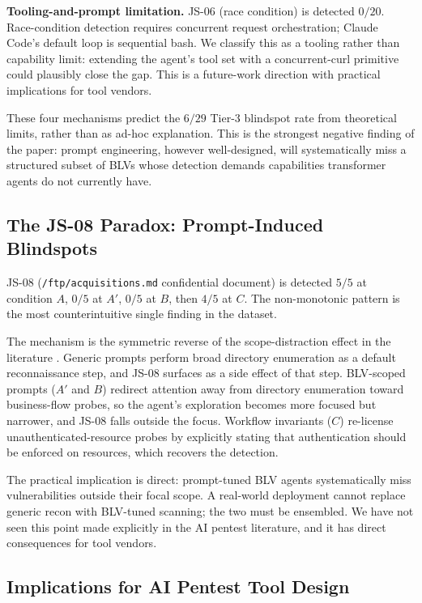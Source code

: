 \documentclass[conference]{IEEEtran}
\begin{document}
\textbf{Tooling-and-prompt limitation.} JS-06 (race condition) is detected $0/20$. Race-condition detection requires concurrent request orchestration; Claude Code's default loop is sequential bash. We classify this as a tooling rather than capability limit: extending the agent's tool set with a concurrent-curl primitive could plausibly close the gap. This is a future-work direction with practical implications for tool vendors.

These four mechanisms predict the $6/29$ Tier-3 blindspot rate from theoretical limits, rather than as ad-hoc explanation. This is the strongest negative finding of the paper: prompt engineering, however well-designed, will systematically miss a structured subset of BLVs whose detection demands capabilities transformer agents do not currently have.

\subsection{The JS-08 Paradox: Prompt-Induced Blindspots}
\label{sec:js08}

JS-08 (\texttt{/ftp/acquisitions.md} confidential document) is detected $5/5$ at condition $A$, $0/5$ at $A'$, $0/5$ at $B$, then $4/5$ at $C$. The non-monotonic pattern is the most counterintuitive single finding in the dataset.

The mechanism is the symmetric reverse of the scope-distraction effect in the literature \cite{shi2023distracted}. Generic prompts perform broad directory enumeration as a default reconnaissance step, and JS-08 surfaces as a side effect of that step. BLV-scoped prompts ($A'$ and $B$) redirect attention away from directory enumeration toward business-flow probes, so the agent's exploration becomes more focused but narrower, and JS-08 falls outside the focus. Workflow invariants ($C$) re-license unauthenticated-resource probes by explicitly stating that authentication should be enforced on resources, which recovers the detection.

The practical implication is direct: prompt-tuned BLV agents systematically miss vulnerabilities outside their focal scope. A real-world deployment cannot replace generic recon with BLV-tuned scanning; the two must be ensembled. We have not seen this point made explicitly in the AI pentest literature, and it has direct consequences for tool vendors.

\subsection{Implications for AI Pentest Tool Design}
\end{document}
